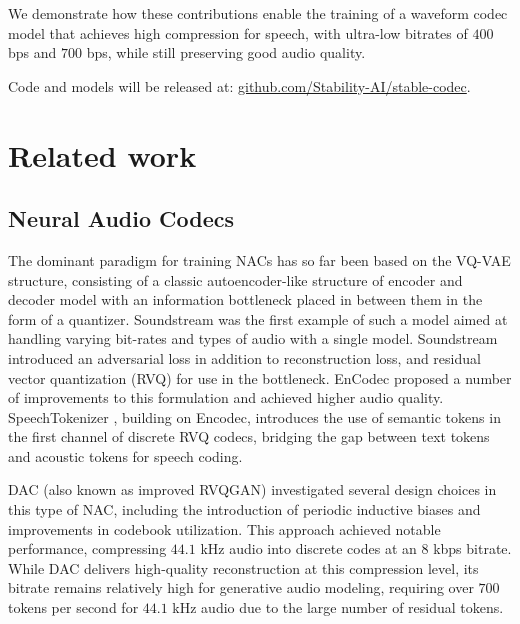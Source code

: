 \documentclass{article} %
\begin{document}

We demonstrate how these contributions enable the training of a waveform codec model that achieves high compression for speech, with ultra-low bitrates of $400$ bps and $700$ bps, while still preserving good audio quality. 

Code and models will be released at: \url{github.com/Stability-AI/stable-codec}. 


\section{Related work}
\subsection{Neural Audio Codecs}
The dominant paradigm for training NACs has so far been based on the VQ-VAE structure, consisting of a classic autoencoder-like structure of encoder and decoder model with an information bottleneck placed in between them in the form of a quantizer. Soundstream \citep{zeghidour2021soundstream} was the first example of such a model aimed at handling varying bit-rates and types of audio with a single model. Soundstream introduced an adversarial loss in addition to reconstruction loss, and residual vector quantization (RVQ) for use in the bottleneck. EnCodec \citep{défossez2022high} proposed a number of improvements to this formulation and achieved higher audio quality. SpeechTokenizer \citep{zhang2023speechtokenizer}, building on Encodec, introduces the use of semantic tokens in the first channel of discrete RVQ codecs, bridging the gap between text tokens and acoustic tokens for speech coding.

DAC (also known as improved RVQGAN) \citep{kumar2023highfidelity} investigated several design choices in this type of NAC, including the introduction of periodic inductive biases and improvements in codebook utilization. This approach achieved notable performance, compressing $44.1$ kHz audio into discrete codes at an $8$ kbps bitrate. While DAC delivers high-quality reconstruction at this compression level, its bitrate remains relatively high for generative audio modeling, requiring over $700$ tokens per second for $44.1$ kHz audio due to the large number of residual tokens. 
\end{document}
